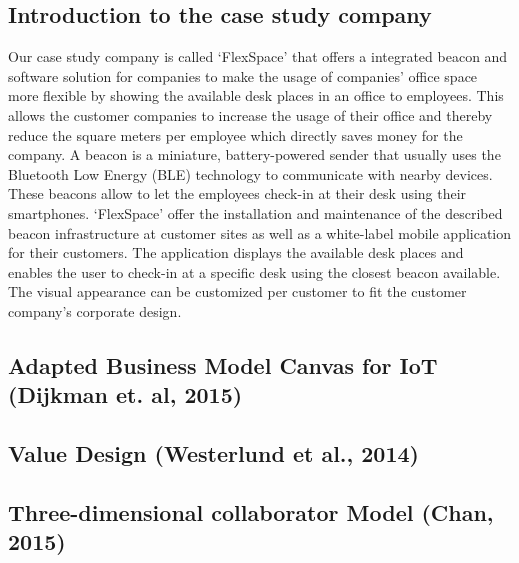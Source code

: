 	\subsection{Introduction to the case study company}
	Our case study company is called `FlexSpace' that offers a integrated beacon and software solution for companies to make the usage of companies' office space more flexible by showing the available desk places in an office to employees. This allows the customer companies to increase the usage of their office and thereby reduce the square meters per employee which directly saves money for the company. A beacon is a miniature, battery-powered sender that usually uses the Bluetooth Low Energy (BLE) technology to communicate with nearby devices. These beacons allow to let the employees check-in at their desk using their smartphones. `FlexSpace' offer the installation and maintenance of the described beacon infrastructure at customer sites as well as a white-label mobile application for their customers. The application displays the available desk places and enables the user to check-in at a specific desk using the closest beacon available. The visual appearance can be customized per customer to fit the customer company's corporate design.


	\subsection{Adapted Business Model Canvas for IoT (Dijkman et. al, 2015)}

	\subsection{Value Design (Westerlund et al., 2014)}

	\subsection{Three-dimensional collaborator Model (Chan, 2015)}

